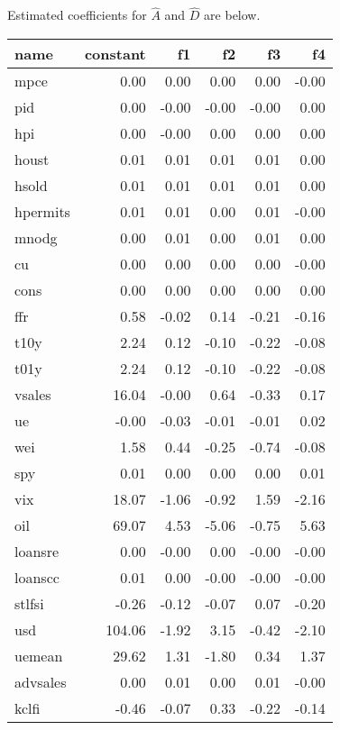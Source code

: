 \documentclass[11pt, letterpaper]{article}\usepackage[]{graphicx}\usepackage[]{color}
\begin{document}
Estimated coefficients for $\widehat{A}$ and $\widehat{D}$ are below.
\begin{table}[H]
\centering
\begingroup\footnotesize
\begin{tabular}{lrrrrr}
  \hline
name & constant & f1 & f2 & f3 & f4 \\ 
  \hline
mpce & 0.00 & 0.00 & 0.00 & 0.00 & -0.00 \\ 
  pid & 0.00 & -0.00 & -0.00 & -0.00 & 0.00 \\ 
  hpi & 0.00 & -0.00 & 0.00 & 0.00 & 0.00 \\ 
  houst & 0.01 & 0.01 & 0.01 & 0.01 & 0.00 \\ 
  hsold & 0.01 & 0.01 & 0.01 & 0.01 & 0.00 \\ 
  hpermits & 0.01 & 0.01 & 0.00 & 0.01 & -0.00 \\ 
  mnodg & 0.00 & 0.01 & 0.00 & 0.01 & 0.00 \\ 
  cu & 0.00 & 0.00 & 0.00 & 0.00 & -0.00 \\ 
  cons & 0.00 & 0.00 & 0.00 & 0.00 & 0.00 \\ 
  ffr & 0.58 & -0.02 & 0.14 & -0.21 & -0.16 \\ 
  t10y & 2.24 & 0.12 & -0.10 & -0.22 & -0.08 \\ 
  t01y & 2.24 & 0.12 & -0.10 & -0.22 & -0.08 \\ 
  vsales & 16.04 & -0.00 & 0.64 & -0.33 & 0.17 \\ 
  ue & -0.00 & -0.03 & -0.01 & -0.01 & 0.02 \\ 
  wei & 1.58 & 0.44 & -0.25 & -0.74 & -0.08 \\ 
  spy & 0.01 & 0.00 & 0.00 & 0.00 & 0.01 \\ 
  vix & 18.07 & -1.06 & -0.92 & 1.59 & -2.16 \\ 
  oil & 69.07 & 4.53 & -5.06 & -0.75 & 5.63 \\ 
  loansre & 0.00 & -0.00 & 0.00 & -0.00 & -0.00 \\ 
  loanscc & 0.01 & 0.00 & -0.00 & -0.00 & -0.00 \\ 
  stlfsi & -0.26 & -0.12 & -0.07 & 0.07 & -0.20 \\ 
  usd & 104.06 & -1.92 & 3.15 & -0.42 & -2.10 \\ 
  uemean & 29.62 & 1.31 & -1.80 & 0.34 & 1.37 \\ 
  advsales & 0.00 & 0.01 & 0.00 & 0.01 & -0.00 \\ 
  kclfi & -0.46 & -0.07 & 0.33 & -0.22 & -0.14 \\ 

\end{tabular}
\end{table}
\end{document}
